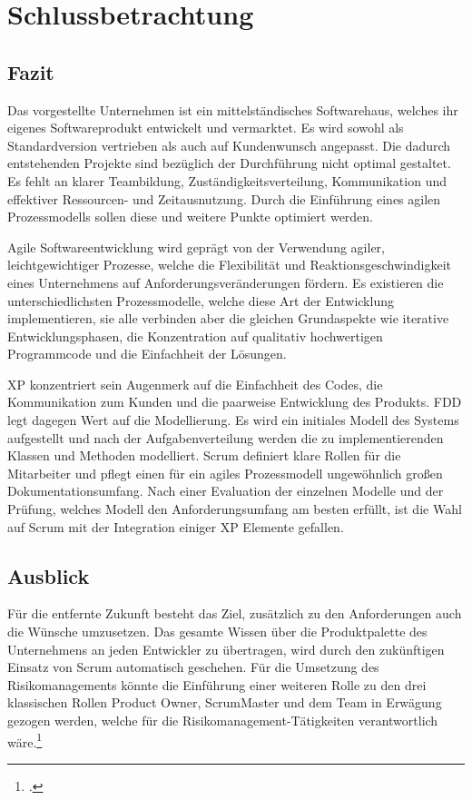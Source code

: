 \newpage
\section{Schlussbetrachtung}
\subsection{Fazit}
Das vorgestellte Unternehmen ist ein mittelständisches Softwarehaus, welches ihr eigenes Softwareprodukt entwickelt und vermarktet. Es wird sowohl als Standardversion vertrieben als auch auf Kundenwunsch angepasst. Die dadurch entstehenden Projekte sind bezüglich der Durchführung nicht optimal gestaltet. Es fehlt an klarer Teambildung, Zuständigkeitsverteilung, Kommunikation und effektiver Ressourcen- und Zeitausnutzung. Durch die Einführung eines agilen Prozessmodells sollen diese und weitere Punkte optimiert werden.

Agile Softwareentwicklung wird geprägt von der Verwendung agiler, leichtgewichtiger Prozesse, welche die Flexibilität und Reaktionsgeschwindigkeit eines Unternehmens auf Anforderungsveränderungen fördern. Es existieren die unterschiedlichsten Prozessmodelle, welche diese Art der Entwicklung implementieren, sie alle verbinden aber die gleichen Grundaspekte wie iterative Entwicklungsphasen, die Konzentration auf qualitativ hochwertigen Programmcode und die Einfachheit der Lösungen.

XP konzentriert sein Augenmerk auf die Einfachheit des Codes, die Kommunikation zum Kunden und die paarweise Entwicklung des Produkts. FDD legt dagegen Wert auf die Modellierung. Es wird ein initiales Modell des Systems aufgestellt und nach der Aufgabenverteilung werden die zu implementierenden Klassen und Methoden modelliert. Scrum definiert klare Rollen für die Mitarbeiter und pflegt einen für ein agiles Prozessmodell ungewöhnlich großen Dokumentationsumfang. Nach einer Evaluation der einzelnen Modelle und der Prüfung, welches Modell den Anforderungsumfang am besten erfüllt, ist die Wahl auf Scrum mit der Integration einiger XP Elemente gefallen.

\subsection{Ausblick}
Für die entfernte Zukunft besteht das Ziel, zusätzlich zu den Anforderungen auch die Wünsche umzusetzen. Das gesamte Wissen über die Produktpalette des Unternehmens an jeden Entwickler zu übertragen, wird durch den zukünftigen Einsatz von Scrum automatisch geschehen. Für die Umsetzung des Risikomanagements könnte die Einführung einer weiteren Rolle zu den drei klassischen Rollen Product Owner, ScrumMaster und dem Team in Erwägung gezogen werden, welche für die Risikomanagement-Tätigkeiten verantwortlich wäre.\footcite[Vgl.][Seite 197]{nelson}
